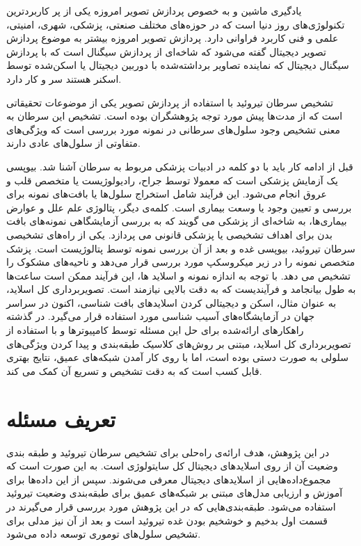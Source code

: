 
یادگیری ماشین و به خصوص پردازش تصویر امروزه یکی از پر کاربردترین تکنولوژی‌های روز دنیا است که در حوزه‌های مختلف صنعتی، پزشکی، شهری، امنیتی، علمی و فنی کاربرد فراوانی دارد.
پردازش تصویر امروزه بیشتر به موضوع پردازش تصویر دیجیتال گفته می‌شود که شاخه‌ای از پردازش سیگنال است که با پردازش سیگنال دیجیتال که نماینده تصاویر برداشته‌شده با دوربین دیجیتال یا اسکن‌شده توسط اسکنر هستند سر و کار دارد.

تشخیص سرطان تیروئید با استفاده از پردازش تصویر یکی از موضوعات تحقیقاتی است که از مدت‌ها پیش مورد توجه پژوهشگران بوده است. تشخیص این سرطان به معنی تشخیص وجود سلول‌های سرطانی در نمونه مورد بررسی است که ویژگی‌های متفاوتی از سلول‌های عادی دارند.

قبل از ادامه کار باید با دو کلمه در ادبیات پزشکی مربوط به سرطان آشنا شد.
بیوپسی یک آزمایش پزشکی است که معمولا توسط جراح، رادیولوژیست یا متخصص قلب و عروق انجام می‌شود.
این فرآیند شامل استخراج سلول‌ها یا بافت‌های نمونه برای بررسی و تعیین وجود یا وسعت بیماری است. کلمه‌ی دیگر، پتالوژی علم علل و عوارض بیماری‌ها، به شاخه‌ای از پزشکی می گویند که به بررسی آزمایشگاهی نمونه‌های بافت بدن برای اهداف تشخیصی یا پزشکی قانونی می پردازد.
یکی از راه‌های تشخیصی سرطان تیروئید، بیوپسی غده و بعد از آن بررسی نمونه توسط پتالوژیست است. پزشک متخصص نمونه را در زیر میکروسکپ مورد بررسی قرار می‌دهد و ناحیه‌های مشکوک را تشخیص می دهد. با توجه به اندازه نمونه و اسلاید ها، این فرآیند ممکن است ساعت‌ها به طول بیانجامد و فرآیندیست که به دقت بالایی نیازمند است.
تصویربرداری کل اسلاید، به عنوان مثال، اسکن و دیجیتالی کردن اسلایدهای بافت شناسی، اکنون در سراسر جهان در آزمایشگاه‌های آسیب شناسی مورد استفاده قرار می‌گیرد.
در گذشته راهکارهای ارائه‌شده برای حل این مسئله توسط کامپیوتر‌ها و با استفاده از تصویربرداری کل اسلاید، مبتنی بر روش‌های کلاسیک طبقه‌بندی و پیدا کردن ویژگی‌های سلولی به صورت دستی بوده است، اما با روی کار آمدن شبکه‌های عمیق، نتایج بهتری قابل کسب است که به دقت تشخیص و تسریع آن کمک می کند.

\section{تعریف مسئله}\label{sec:تعریف مسئله}
در این پژوهش، هدف ارائه‌ی راه‌حلی برای تشخیص سرطان تیروئید و طبقه بندی وضعیت آن از روی اسلاید‌های دیجیتال کل سایتولوژی است.
به این صورت است که مجموع‌داده‌هایی از اسلاید‌های دیجیتال معرفی می‌شوند. سپس از این داده‌ها برای آموزش و ارزیابی مدل‌های مبتنی بر شبکه‌های عمیق برای طبقه‌بندی وضعیت تیروئید استفاده می‌شود. طبقه‌بندی‌هایی که در این پژوهش مورد بررسی قرار می‌گیرند در قسمت اول بدخیم و خوشخیم بودن غده تیروئید است و بعد از آن نیز مدلی برای تشخیص سلول‌های توموری توسعه داده می‌شود.

